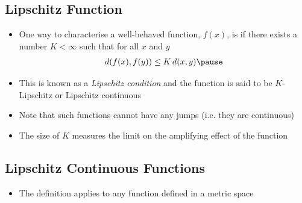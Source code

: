 
\begin{slide}
\section{Lipschitz Function}

\begin{PauseHighLight}
  \begin{itemize}
  \item One way to characterise a well-behaved function, $f(x)$, is if there
    exists a number $K<\infty$ such that for all $x$ and $y$
    \begin{align*}
      d(f(x), f(y)) \leq K\, d(x,y)\pause
    \end{align*}
  \item This is known as a \emph{Lipschitz condition} and the function is
    said to be $K$-Lipschitz\pause{} or Lipschitz continuous\pauseb
  \item Note that such functions cannot have any jumps (i.e. they are
    continuous)\pause
  \item The size of $K$ measures the limit on the amplifying effect of
    the function\pause
  \end{itemize}
\end{PauseHighLight}

\end{slide}



\begin{slide}
\section[-1.5]{Lipschitz Continuous Functions}
  
\pb\pause{}
\begin{center}
  \pause
\end{center}
\begin{itemize}
\item The definition applies to any function defined in a
  metric space\pause
\end{itemize}
\end{slide}



